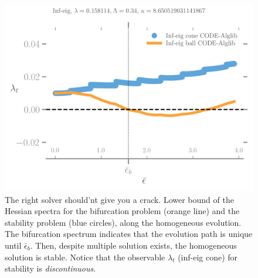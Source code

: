 \begin{figure}[htbp]
    \centering
    \includegraphics*[width=.7\textwidth]{../images/irreversibility_inf_eig.png}
    \caption{The right solver should'nt give you a crack. Lower bound of the Hessian spectra for the bifurcation problem  (orange line) and the stability problem (blue circles), along the homogeneous evolution. The bifurcation spectrum indicates  that the evolution path is unique until $\bar \epsilon_b$. Then, despite multiple solution exists, the homogeneous solution is stable. Notice that the observable $\lambda_t$ (inf-eig cone) for stability is \emph{discontinuous}.
    }
    \label{fig:shouldnt}
\end{figure}
